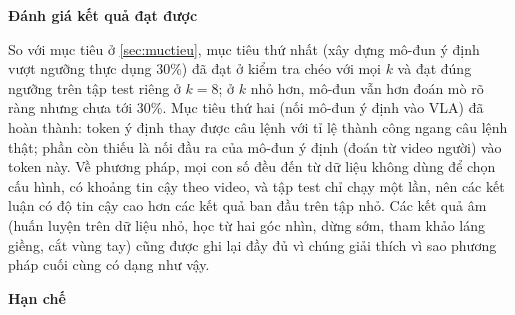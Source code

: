 \documentclass[a4paper,oneside]{report}
\newcommand{\mucnho}[1]{\par\vspace{4pt}\noindent\textbf{#1}\par\nobreak}
\begin{document}
\mucnho{Đánh giá kết quả đạt được}

So với mục tiêu ở \cref{sec:muctieu}, mục tiêu thứ nhất (xây dựng mô-đun ý định vượt ngưỡng thực dụng 30\%) đã đạt ở kiểm tra chéo với mọi $k$ và đạt đúng ngưỡng trên tập test riêng ở $k=8$; ở $k$ nhỏ hơn, mô-đun vẫn hơn đoán mò rõ ràng nhưng chưa tới 30\%. Mục tiêu thứ hai (nối mô-đun ý định vào VLA) đã hoàn thành: token ý định thay được câu lệnh với tỉ lệ thành công ngang câu lệnh thật; phần còn thiếu là nối đầu ra của mô-đun ý định (đoán từ video người) vào token này. Về phương pháp, mọi con số đều đến từ dữ liệu không dùng để chọn cấu hình, có khoảng tin cậy theo video, và tập test chỉ chạy một lần, nên các kết luận có độ tin cậy cao hơn các kết quả ban đầu trên tập nhỏ. Các kết quả âm (huấn luyện trên dữ liệu nhỏ, học từ hai góc nhìn, dừng sớm, tham khảo láng giềng, cắt vùng tay) cũng được ghi lại đầy đủ vì chúng giải thích vì sao phương pháp cuối cùng có dạng như vậy.

\mucnho{Hạn chế}
\end{document}
